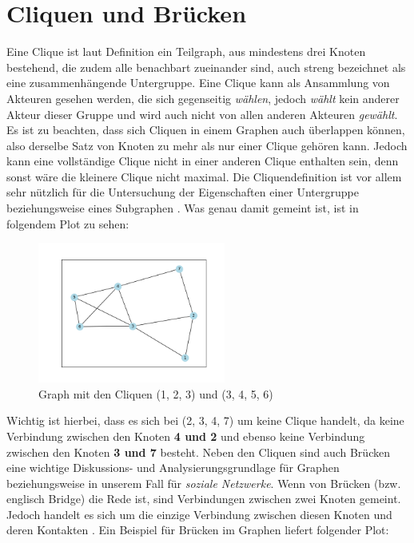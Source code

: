 \section{Cliquen und Brücken}
Eine Clique ist laut Definition ein Teilgraph, aus mindestens drei Knoten bestehend, die zudem alle benachbart zueinander sind, auch streng bezeichnet als eine zusammenhängende Untergruppe. Eine Clique kann als Ansammlung von Akteuren gesehen werden, die sich gegenseitig \textit{wählen}, jedoch \textit{wählt} kein anderer Akteur dieser Gruppe und wird auch nicht von allen anderen Akteuren \textit{gewählt}. Es ist zu beachten, dass sich Cliquen in einem Graphen auch überlappen können, also derselbe Satz von Knoten zu mehr als nur einer Clique gehören kann. Jedoch kann eine vollständige Clique nicht in einer anderen Clique enthalten sein, denn sonst wäre die kleinere Clique nicht maximal. Die Cliquendefinition ist vor allem sehr nützlich für die Untersuchung der Eigenschaften einer Untergruppe beziehungsweise eines Subgraphen \cite{wasserman1994social}. Was genau damit gemeint ist, ist in folgendem Plot zu sehen: 
\FloatBarrier
\begin{figure}[htb!]
    \centering
    \includegraphics[width=0.55\textwidth]{Graphics/Clique.png}
    \caption{Graph mit den Cliquen (1, 2, 3) und (3, 4, 5, 6)}
    \label{fig:Clique}
\end{figure}

\newpage
Wichtig ist hierbei, dass es sich bei (2, 3, 4, 7) um keine Clique handelt, da keine Verbindung zwischen den Knoten \textbf{4 und 2} und ebenso keine Verbindung zwischen den Knoten \textbf{3 und 7} besteht.
Neben den Cliquen sind auch Brücken eine wichtige Diskussions- und Analysierungsgrundlage für Graphen beziehungsweise in unserem Fall für \textit{soziale Netzwerke}. Wenn von Brücken (bzw. englisch Bridge) die Rede ist, sind Verbindungen zwischen zwei Knoten gemeint. Jedoch handelt es sich um die einzige Verbindung zwischen diesen Knoten und deren Kontakten \cite{bridge}. Ein Beispiel für Brücken im Graphen liefert folgender Plot:

